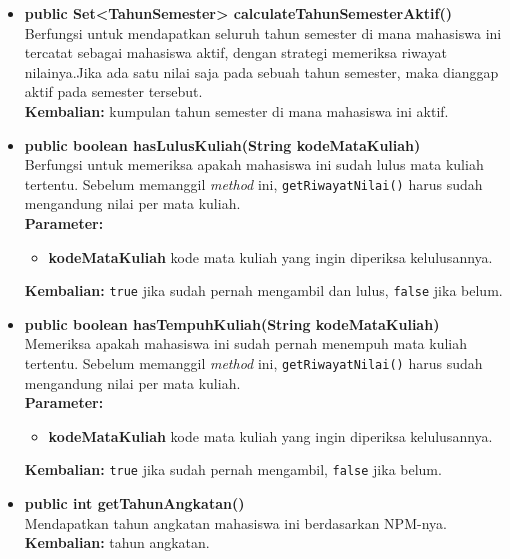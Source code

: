 \begin{itemize}
	\item \textbf{public Set<TahunSemester> calculateTahunSemesterAktif()}\\
		Berfungsi untuk mendapatkan seluruh tahun semester di mana mahasiswa ini tercatat sebagai mahasiswa aktif, dengan strategi memeriksa riwayat nilainya.Jika ada satu nilai saja pada sebuah tahun semester, maka dianggap aktif pada semester tersebut.\\
		\textbf{Kembalian:} kumpulan tahun semester di mana mahasiswa ini aktif.
		
	\item \textbf{public boolean hasLulusKuliah(String kodeMataKuliah)}\\
		Berfungsi untuk memeriksa apakah mahasiswa ini sudah lulus mata kuliah tertentu. Sebelum memanggil \textit{method} ini, \texttt{getRiwayatNilai()} harus sudah mengandung nilai per mata kuliah.\\
		\textbf{Parameter:}
		\begin{itemize}
			\item \textbf{kodeMataKuliah} kode mata kuliah yang ingin diperiksa kelulusannya.
		\end{itemize}
		\textbf{Kembalian:} \texttt{true} jika sudah pernah mengambil dan lulus, \texttt{false} jika belum.
		
	\item \textbf{public boolean hasTempuhKuliah(String kodeMataKuliah)}\\
		Memeriksa apakah mahasiswa ini sudah pernah menempuh mata kuliah tertentu. Sebelum memanggil \textit{method} ini, \texttt{getRiwayatNilai()} harus sudah mengandung nilai per mata kuliah.\\
		\textbf{Parameter:}
		\begin{itemize}
			\item \textbf{kodeMataKuliah} kode mata kuliah yang ingin diperiksa kelulusannya.
		\end{itemize}
		\textbf{Kembalian:} \texttt{true} jika sudah pernah mengambil, \texttt{false} jika belum.
	
	\item \textbf{public int getTahunAngkatan()}\\
		Mendapatkan tahun angkatan mahasiswa ini berdasarkan NPM-nya.\\
		\textbf{Kembalian:} tahun angkatan.
	\end{itemize}


